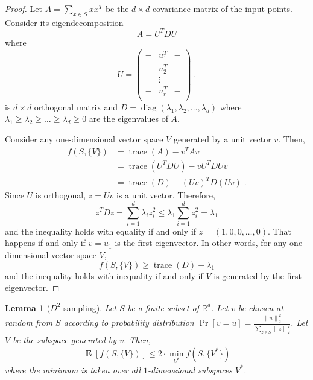 \documentclass[12pt]{article}
\newtheorem{lemma}[theorem]{Lemma}
\newcommand{\R}{\mathbb{R}}
\newcommand{\norm}[1]{\left\|#1\right\|}
\DeclareMathOperator*{\diag}{diag}
\DeclareMathOperator*{\trace}{trace}
\DeclareMathOperator*{\Exp}{\mathbf{E}}
\begin{document}
\begin{proof}
Let $A = \sum_{x \in S} xx^T$ be the $d \times d$
covariance matrix of the input points. Consider its eigendecomposition
$$
A = U^T D U
$$
where
$$
U =
\begin{pmatrix}
- & u_1^T & - \\
- & u_2^T & - \\
  & \vdots & \\
- & u_r^T & - \\
\end{pmatrix} \; .
$$
is $d \times d$ orthogonal matrix and $D = \diag(\lambda_1,
\lambda_2, \dots, \lambda_d)$ where $\lambda_1 \ge \lambda_2 \ge \dots \ge
\lambda_d \ge 0$ are the eigenvalues of $A$.

Consider any one-dimensional vector space $V$ generated by a unit vector $v$.
Then,
\begin{align*}
f(S, \{V\})
& = \trace(A) - v^T A v \\
& = \trace(U^T D U) - v U^T D U v \\
& = \trace(D) - (Uv)^T D (Uv) \; .
\end{align*}
Since $U$ is orthogonal, $z=Uv$ is a unit vector. Therefore,
$$
z^T D z = \sum_{i=1}^d \lambda_i z_i^2 \le \lambda_1 \sum_{i=1}^d z_i^2 = \lambda_1
$$
and the inequality holds with equality if and only if $z=(1,0,0,\dots,0)$.
That happens if and only if $v=u_1$ is the first eigenvector.
In other words, for any one-dimensional vector space $V$,
$$
f(S, \{V\}) \ge \trace(D) - \lambda_1
$$
and the inequality holds with inequality if and only if $V$ is generated
by the first eigenvector.
\end{proof}

\begin{lemma}[$D^2$ sampling]
Let $S$ be a finite subset of $\R^d$. Let $v$ be chosen at random from $S$
according to probability distribution $\Pr[v = u] = \frac{\norm{u}_2^2}{\sum_{z \in S} \norm{z}_2^2}$.
Let $V$ be the subspace generated by $v$. Then,
$$
\Exp[f(S,\{V\})] \le 2 \cdot \min_{V^*} f(S, \{V^*\})
$$
where the minimum is taken over all $1$-dimensional subspaces $V^*$.
\end{lemma}
\end{document}
